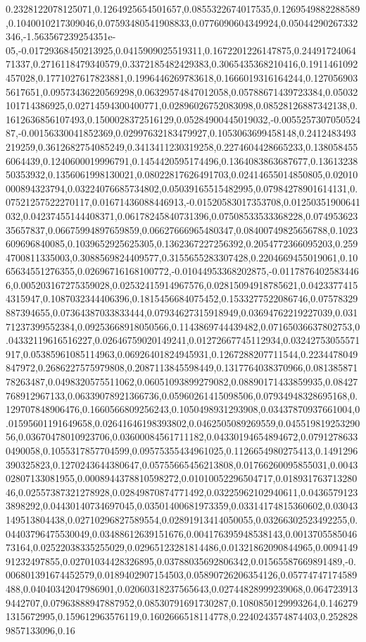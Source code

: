 0.2328122078125071,0.1264925654501657,0.0855322674017535,0.1269549882288589,0.1040010217309046,0.07593480541908833,0.0776090604349924,0.05044290267332346,-1.563567239254351e-05,-0.01729368450213925,0.0415909025519311,0.1672201226147875,0.2449172406471337,0.2716118479340579,0.3372185482429383,0.3065435368210416,0.1911461092457028,0.1771027617823881,0.1996446269783618,0.1666019316164244,0.1270569035617651,0.09573436220569298,0.06329574847012058,0.05788671439723384,0.05032101714386925,0.02714594300400771,0.02896026752083098,0.08528126887342138,0.1612636856107493,0.1500028372516129,0.05284900445019032,-0.005525730705052487,-0.00156330041852369,0.02997632183479927,0.1053063699458148,0.2412483493219259,0.3612682754085249,0.3413411230319258,0.2274604428665233,0.1380584556064439,0.1240600019996791,0.1454420595174496,0.1364083863687677,0.1361323850353932,0.1356061998130021,0.08022817626491703,0.02414655014850805,0.02010000894323794,0.03224076685734802,0.05039165515482995,0.07984278901614131,0.07521257522270117,0.01671436088446913,-0.01520583017353708,0.01250351900641032,0.04237455144408371,0.06178245840731396,0.07508533533368228,0.07495362335657837,0.06675994897659859,0.06627666965480347,0.08400749825656788,0.1023609696840085,0.1039652925625305,0.1362367227256392,0.2054772366095203,0.2594700811335003,0.3088569824409577,0.3155655283307428,0.2204669455019061,0.1065634551276355,0.02696716168100772,-0.01044953368202875,-0.01178764025834466,0.005203167275359028,0.02532415914967576,0.02815094918785621,0.04233774154315947,0.1087032344406396,0.1815456684075452,0.1533277522086746,0.07578329887394655,0.07364387033833444,0.07934627315918949,0.03694762219227039,0.03171237399552384,0.09253668918050566,0.1143869744439482,0.07165036637802753,0.04332119616516227,0.02646759020149241,0.01272667745112934,0.03242753055571917,0.05385961085114963,0.06926401824945931,0.1267288207711544,0.2234478049847972,0.2686227575979808,0.2087113845598449,0.1317764038370966,0.08138587178263487,0.0498320575511062,0.06051093899279082,0.08890171433859935,0.08427768912967133,0.06339078921366736,0.05960261415098506,0.07934948328695168,0.129707848906476,0.1660566809256243,0.1050498931293908,0.03437870937661004,0.01595601191649658,0.02641646198393802,0.0462505089269559,0.04551981925329056,0.03670478010923706,0.03600084561711182,0.04330194654894672,0.07912786330490058,0.1055317857704599,0.09575355434961025,0.1126654980275413,0.1491296390325823,0.1270243644380647,0.05755665456213808,0.01766260095855031,0.004302807133081955,0.0008944378810598272,0.01010052296504717,0.01893176371328046,0.02557387321278928,0.02849870874771492,0.03225962102940611,0.04365791233898292,0.04430140734697045,0.03501400681973359,0.03314174815360602,0.03043149513804438,0.02710296827589554,0.02891913414050055,0.03266302523492255,0.04403796475530049,0.03488612639151676,0.004176395948538143,0.001370558504673164,0.02522038335255029,0.02965123281814486,0.01321862090844965,0.009414991232497855,0.02701034428326895,0.03788035692806342,0.01565587669891489,-0.006801391674452579,0.0189402907154503,0.05890726206354126,0.05774747174589488,0.04040342047986901,0.02060318237565643,0.02744828999239068,0.0647239139442707,0.07963888947887952,0.08530791691730287,0.1080850129993264,0.1462791315672995,0.159612963576119,0.1602666518114778,0.2240243574874403,0.2528289857133096,0.16